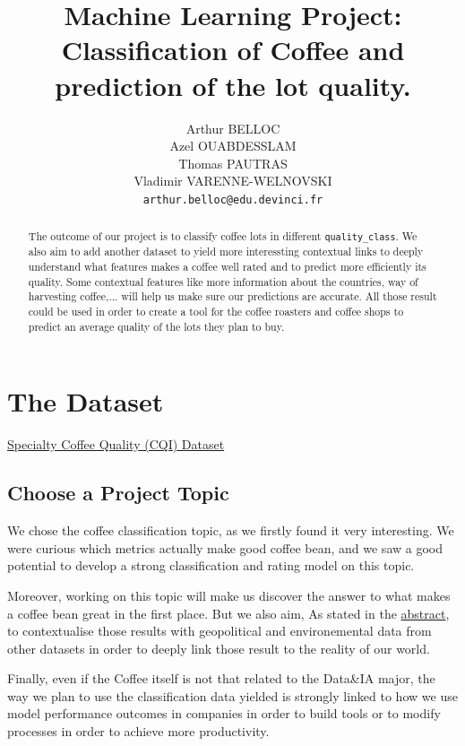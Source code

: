 \documentclass{article}
\title{Machine Learning Project: Classification of Coffee and prediction of the lot quality.}
\author{%
  Arthur BELLOC
\\
  Azel OUABDESSLAM\\
  Thomas PAUTRAS\\
  Vladimir VARENNE-WELNOVSKI\\
  \texttt{arthur.belloc@edu.devinci.fr} \\
}
\begin{document}
\maketitle


\begin{abstract}
  The outcome of our project is to classify coffee lots in different \texttt{quality\_class}. We also aim to add another dataset to yield more interessting contextual links to deeply understand what features makes a coffee well rated and to predict more efficiently its quality. Some contextual features like more information about the countries, way of harvesting coffee,... will help us make sure our predictions are accurate. All those result could be used in order to create a tool for the coffee roasters and coffee shops to predict an average quality of the lots they plan to buy.
\end{abstract}



\section{The Dataset}


\href{https://www.kaggle.com/datasets/abdurrahmanhakanacar/specialty-coffee-quality-and-sensory-profiles-cqi}{Specialty Coffee Quality (CQI) Dataset}


\subsection{Choose a Project Topic}


We chose the coffee classification topic, as we firstly found it very interesting. We were curious which metrics actually make good coffee bean, and we saw a good potential to develop a strong classification and rating model on this topic.

Moreover, working on this topic will make us discover the answer to what makes a coffee bean great in the first place. But we also aim, As stated in the \hyperref[sec:abstract]{abstract}, to contextualise those results with geopolitical and environemental data from other datasets in order to deeply link those result to the reality of our world.

Finally, even if the Coffee itself is not that related to the Data\&IA major, the way we plan to use the classification data yielded is strongly linked to how we use model performance outcomes in companies in order to build tools or to modify processes in order to achieve more productivity.
\end{document}
